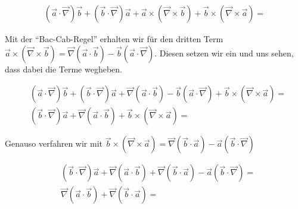 \documentclass[a4paper,german,12pt,smallheadings]{scrartcl}
\begin{document}
\begin{align*}
  (\vec{a}\cdot\vec{\nabla})\vec{b} + (\vec{b} \cdot \vec{\nabla})\vec{a} + \vec{a} \times (\vec{\nabla} \times \vec{b}) + \vec{b} \times (\vec{\nabla} \times \vec{a}) =
\end{align*}

Mit der ``Bac-Cab-Regel'' erhalten wir für den dritten Term $\vec{a} \times
(\vec{\nabla} \times \vec{b}) = \vec{\nabla}(\vec{a}\cdot\vec{b}) -
\vec{b}(\vec{a}\cdot\vec{\nabla})$. Diesen setzen wir ein und uns sehen, dass
dabei die Terme wegheben.

\begin{align*}
  &(\vec{a}\cdot\vec{\nabla})\vec{b} + (\vec{b} \cdot \vec{\nabla})\vec{a} + \vec{\nabla}(\vec{a}\cdot\vec{b}) - \vec{b}(\vec{a}\cdot\vec{\nabla}) + \vec{b} \times (\vec{\nabla} \times \vec{a}) = \\
  &(\vec{b} \cdot \vec{\nabla})\vec{a} + \vec{\nabla}(\vec{a}\cdot\vec{b}) + \vec{b} \times (\vec{\nabla} \times \vec{a}) =
\end{align*}

Genauso verfahren wir mit $\vec{b} \times (\vec{\nabla} \times \vec{a}) = \vec{\nabla}(\vec{b} \cdot \vec{a}) - \vec{a}(\vec{b} \cdot \vec{\nabla})$

\begin{align*}
  &(\vec{b} \cdot \vec{\nabla})\vec{a} + \vec{\nabla}(\vec{a}\cdot\vec{b}) +  \vec{\nabla}(\vec{b} \cdot \vec{a}) - \vec{a}(\vec{b} \cdot \vec{\nabla}) =\\
  &\vec{\nabla}(\vec{a}\cdot\vec{b}) + \vec{\nabla}(\vec{b} \cdot \vec{a}) =\\
\end{align*}
\end{document}
